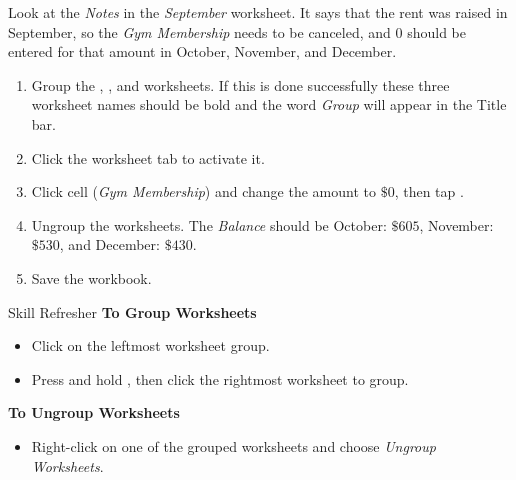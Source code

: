 Look at the \textit{Notes} in the \textit{September} worksheet. It says that the rent was raised in September, so the \textit{Gym Membership} needs to be canceled, and $ 0 $ should be entered for that amount in October, November, and December.

\begin{enumbox}
	\begin{enumerate}
		\item Group the , , and  worksheets. If this is done successfully these three worksheet names should be bold and the word \textit{Group} will appear in the Title bar.
		\item Click the  worksheet tab to activate it.
		\item Click cell  (\textit{Gym Membership}) and change the amount to $ \$0 $, then tap .
		\item Ungroup the worksheets. The \textit{Balance} should be October: $ \$605 $, November: $ \$530 $, and December: $ \$430 $.
		\item Save the  workbook.
	\end{enumerate}
\end{enumbox}

\begin{center}
	\begin{sklbox}{Skill Refresher}
		\textbf{To Group Worksheets}
		\\
		\begin{itemize}
			\setlength{\itemsep}{0pt}
			\setlength{\parskip}{0pt}
			\setlength{\parsep}{0pt}
			
			\item Click on the leftmost worksheet group.
			\item Press and hold , then click the rightmost worksheet to group.
		\end{itemize}
			
		\bigskip
			
		\textbf{To Ungroup Worksheets}
		\begin{itemize}
			\setlength{\itemsep}{0pt}
			\setlength{\parskip}{0pt}
			\setlength{\parsep}{0pt}
			
			\item Right-click on one of the grouped worksheets and choose \textit{Ungroup Worksheets}.
		\end{itemize}
	\end{sklbox}
\end{center}


